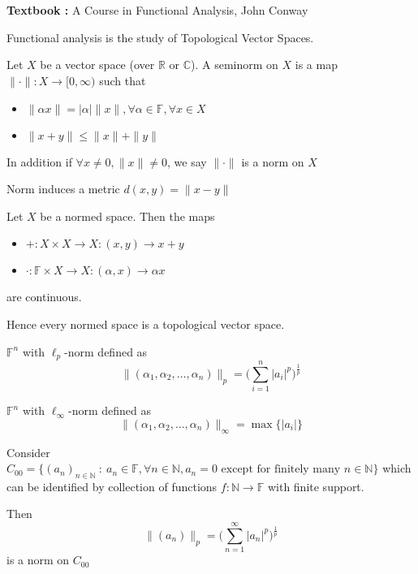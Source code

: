 
\chapter{}

\textbf{Textbook :} A Course in Functional Analysis, John Conway

Functional analysis is the study of Topological Vector Spaces.

\begin{definition}
  Let $X$ be a vector space (over $\mathbb{R}$ or $\mathbb{C}$). A seminorm on $X$ is a map $\|\cdot \|: X \to [0, \infty)$ such that
  \begin{itemize}
    \item  $\|\alpha x\| = |\alpha|\| x \|, \forall \alpha \in \mathbb{F}, \forall x \in X$
    \item $\|x+y\| \le \|x\| + \|y\|$
  \end{itemize}
  In addition if $\forall x\neq 0, \|x\| \neq 0$, we say $\|\cdot\|$ is a norm on $X$
\end{definition}

Norm induces a metric $ d(x, y) = \|x-y\|$

\begin{note}
  Let $X$ be a normed space. Then the maps
  \begin{itemize}
    \item $+: X \times X \to X : (x, y) \to x+y$
    \item $\cdot: \mathbb{F} \times X \to X: (\alpha, x) \to \alpha x$
  \end{itemize}
  are continuous.
\end{note}

Hence every normed space is a topological vector space.

\begin{example}
  $\mathbb{F}^n$ with $\ell_p$-norm defined as \[
    \|(\alpha_1, \alpha_2, \ldots, \alpha_n)\|_p = \Big(\sum_{i = 1}^{n} |a_i|^p\Big)^{ \frac{1}{p} }
  \]
\end{example}

\begin{example}
  $\mathbb{F}^n$ with $\ell_\infty$-norm defined as \[
    \|(\alpha_1, \alpha_2, \ldots, \alpha_n)\|_\infty = \max \{ |a_i| \}
  \]
\end{example}

\begin{example}
  Consider $C_{00} = \{ (a_n)_{n \in \mathbb{N}}  \ : \   a_n \in \mathbb{F}, \forall n \in \mathbb{N}, a_n = 0  \textrm{ except for finitely many }  n \in \mathbb{N}\}$ which can be identified by collection of functions $  f: \mathbb{N} \to \mathbb{F}$ with finite support.

  Then $$\|(a_n)\|_p = \Big(\sum_{n = 1}^{\infty} |a_n|^p\Big)^{ \frac{1}{p} }$$
  is a norm on $C_{00}$
\end{example}

